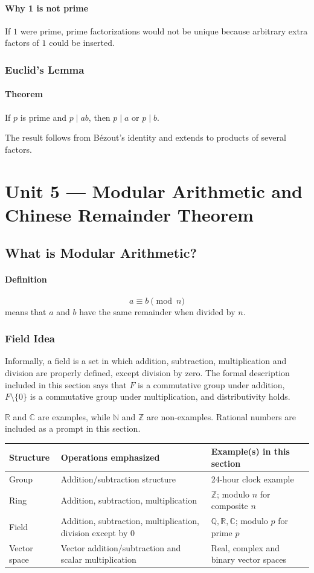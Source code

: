 \documentclass[12pt]{article}
\newcommand{\Definition}{\paragraph{Definition}}
\newcommand{\Theorem}{\paragraph{Theorem}}
\begin{document}
\paragraph{Why 1 is not prime}
If $1$ were prime, prime factorizations would not be unique because arbitrary extra factors of $1$ could be inserted.

\subsubsection{Euclid's Lemma}
\Theorem If $p$ is prime and $p\mid ab$, then $p\mid a$ or $p\mid b$.

The result follows from Bézout's identity and extends to products of several factors.

\newpage
\newpage
\section{Unit 5 --- Modular Arithmetic and Chinese Remainder Theorem}

\subsection{What is Modular Arithmetic?}
\Definition
\[
a\equiv b\pmod n
\]
means that $a$ and $b$ have the same remainder when divided by $n$.

\subsubsection{Field Idea}
Informally, a field is a set in which addition, subtraction, multiplication and division are properly defined, except division by zero. The formal description included in this section says that $F$ is a commutative group under addition, $F\setminus\{0\}$ is a commutative group under multiplication, and distributivity holds.

$\mathbb R$ and $\mathbb C$ are examples, while $\mathbb N$ and $\mathbb Z$ are non-examples. Rational numbers are included as a prompt in this section.

\begin{table}[H]
\centering
\small
\begin{tabularx}{\textwidth}{lXX}
\toprule
Structure & Operations emphasized & Example(s) in this section\\
\midrule
Group & Addition/subtraction structure & 24-hour clock example\\
Ring & Addition, subtraction, multiplication & $\mathbb Z$; modulo $n$ for composite $n$\\
Field & Addition, subtraction, multiplication, division except by 0 & $\mathbb Q,\mathbb R,\mathbb C$; modulo $p$ for prime $p$\\
Vector space & Vector addition/subtraction and scalar multiplication & Real, complex and binary vector spaces\\
\bottomrule
\end{tabularx}
\end{table}
\end{document}
